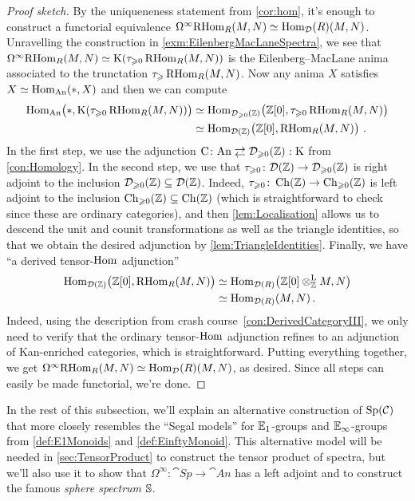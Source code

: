 \begin{proof}[Proof sketch]
	By the uniqueneness statement from \cref{cor:hom}, it's enough to construct a functorial equivalence $\Omega^\infty\!\operatorname{RHom}_R(M,N)\simeq \operatorname{Hom}_{\mathcal{D}}(R)(M,N)$. Unravelling the construction in \cref{exm:EilenbergMacLaneSpectra}, we see that $\Omega^\infty\!\operatorname{RHom}_R(M,N)\simeq \operatorname{K}(\tau_{\geqslant 0}\operatorname{RHom}_R(M,N))$ is the Eilenberg--MacLane anima associated to the trunctation $\tau_{\geqslant}\operatorname{RHom}_R(M,N)$. Now any anima $X$ satisfies $X\simeq \operatorname{Hom}_{\mathrm{An}}(*,X)$ and then we can compute
	\begin{align*}
		\Hom_{\cat{An}}\lef(*,\K(\tau_{\geqslant 0}\RHom_R(M,N))\righ)&\simeq \Hom_{\Dd_{\geqslant 0}(\IZ)}\lef(\IZ[0],\tau_{\geqslant 0}\RHom_R(M,N)\righ)\\
		&\simeq \Hom_{\Dd(\IZ)}\lef(\IZ[0],\RHom_R(M,N)\righ)\,.
	\end{align*}
	In the first step, we use the adjunction $\C\colon \cat{An}\shortdoublelrmorphism \Dd_{\geqslant 0}(\IZ)\noloc \K$ from \cref{con:Homology}. In the second step, we use that $\tau_{\geqslant 0}\colon \mathcal{D}(\mathbb{Z})\rightarrow \mathcal{D}_{\geqslant 0}(\mathbb{Z})$ is right adjoint to the inclusion $\mathcal{D}_{\geqslant 0}(\mathbb{Z})\subseteq \mathcal{D}(\mathbb{Z})$. Indeed, $\tau_{\geqslant 0}\colon \operatorname{Ch}(\mathbb{Z})\rightarrow \mathrm{Ch}_{\geqslant 0}(\mathbb{Z})$ is left adjoint to the inclusion $\operatorname{Ch}_{\geqslant 0}(\mathbb{Z})\subseteq \operatorname{Ch}(\mathbb{Z})$ (which is straightforward to check since these are ordinary categories), and then \cref{lem:Localisation} allows us to descend the unit and counit transformations as well as the triangle identities, so that we obtain the desired adjunction by \cref{lem:TriangleIdentities}. Finally, we have \enquote{a derived tensor-$\operatorname{Hom}$ adjunction}
	\begin{align*}
		\Hom_{\Dd(\IZ)}\lef(\IZ[0],\RHom_R(M,N)\righ)&\simeq\Hom_{\Dd(R)}\bigl(\IZ[0]\lotimes_\IZ M,N\bigr)\\
		&\simeq\Hom_{\Dd(R)}(M,N)\,.
	\end{align*}
	Indeed, using the description from crash course~\cref{con:DerivedCategoryIII}, we only need to verify that the ordinary tensor-$\operatorname{Hom}$ adjunction refines to an adjunction of Kan-enriched categories, which is straightforward. Putting everything together, we get $\Omega^\infty\!\operatorname{RHom}_R(M,N)\simeq \operatorname{Hom}_{\mathcal{D}}(R)(M,N)$, as desired. Since all steps can easily be made functorial, we're done.
\end{proof}
In the rest of this subsection, we'll explain an alternative construction of $\mathrm{Sp}(\mathcal{C})$ that more closely resembles the \enquote{Segal models} for $\mathbb{E}_1$-groups and $\mathbb{E}_\infty$-groups from \cref{def:E1Monoids} and \cref{def:EinftyMonoid}. This alternative model will be needed in \cref{sec:TensorProduct} to construct the tensor product of spectra, but we'll also use it to show that $\Omega^\infty \colon \cat{Sp}\rightarrow \cat{An}$ has a left adjoint and to construct the famous \emph{sphere spectrum} $\mathbb{S}$.
